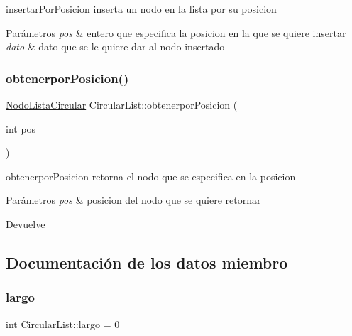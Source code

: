 insertar\+Por\+Posicion inserta un nodo en la lista por su posicion 


\begin{DoxyParams}{Parámetros}
{\em pos} & entero que especifica la posicion en la que se quiere insertar \\
\hline
{\em dato} & dato que se le quiere dar al nodo insertado \\
\hline
\end{DoxyParams}
\mbox{\label{class_circular_list_abc60af99960852c2aecfc352dd55f48e}} 
\subsubsection{\texorpdfstring{obtenerpor\+Posicion()}{obtenerporPosicion()}}
{\footnotesize\ttfamily \mbox{\hyperlink{class_nodo_lista_circular}{Nodo\+Lista\+Circular}} Circular\+List\+::obtenerpor\+Posicion (\begin{DoxyParamCaption}\item[{int}]{pos }\end{DoxyParamCaption})\hspace{0.3cm}{\ttfamily [inline]}}



obtenerpor\+Posicion retorna el nodo que se especifica en la posicion 


\begin{DoxyParams}{Parámetros}
{\em pos} & posicion del nodo que se quiere retornar \\
\hline
\end{DoxyParams}
\begin{DoxyReturn}{Devuelve}

\end{DoxyReturn}


\subsection{Documentación de los datos miembro}
\mbox{\label{class_circular_list_ab94765d81b2b6bd145abdb7dad48339e}} 
\subsubsection{\texorpdfstring{largo}{largo}}
{\footnotesize\ttfamily int Circular\+List\+::largo = 0}


